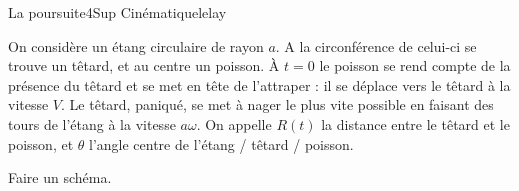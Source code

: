 \begin{exercise}{La poursuite}{4}{Sup}
{Cinématique}{lelay}

On considère un étang circulaire de rayon $a$. A la circonférence de celui-ci se trouve un têtard, et au centre un poisson. À $t=0$ le poisson se rend compte de la présence du têtard et se met en tête de l'attraper : il se déplace vers le têtard à la vitesse $V$. Le têtard, paniqué, se met à nager le plus vite possible en faisant des tours de l'étang à la vitesse $a\omega$. On appelle $R(t)$ la distance entre le têtard et le poisson, et $\theta$ l'angle centre de l'étang / têtard / poisson.
\begin{questions}
    \question Faire un schéma.
    
\end{questions}

\end{exercise}